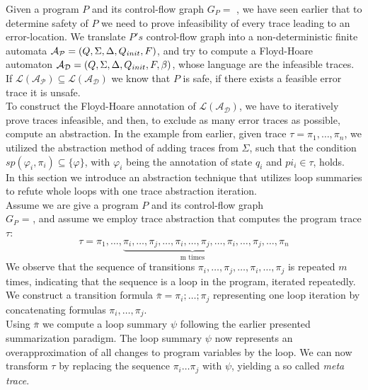 
Given a program $P$ and its control-flow graph $G_P = $ \cfg, we have seen earlier that to determine safety of $P$ we need to prove infeasibility of every trace leading to an error-location. We translate $P's$ control-flow graph into a non-deterministic finite automata $\mathcal{A_{P}} = (Q, \Sigma, \Delta, Q_{init}, F)$, and try to compute a Floyd-Hoare automaton $\mathcal{A_{D}} = (Q, \Sigma, \Delta, Q_{init}, F, \beta)$, whose language are the infeasible traces. If $\mathcal{L(A_P)} \subseteq \mathcal{L(A_D)}$ we know that $P$ is safe, if there exists a feasible error trace it is unsafe. \\ To construct the Floyd-Hoare annotation of $\mathcal{L(A_D)}$, we have to iteratively prove traces infeasible, and then, to exclude as many error traces as possible, compute an abstraction. In the example from earlier, given trace $\tau = \pi_1, \ldots, \pi_n$, we utilized the abstraction method of adding traces from $\Sigma$, such that the condition $sp(\varphi_i, \pi_i) \subseteq \{\varphi\}$, with $\varphi_i$ being the annotation of state $q_i$ and $pi_i \in \tau$, holds. \\
In this section we introduce an abstraction technique that utilizes loop summaries to refute whole loops with one trace abstraction iteration. \\

Assume we are give a program $P$ and its control-flow graph \\ $G_P$ = \cfg, and assume we employ trace abstraction that computes the program trace $\tau$:
\begin{equation*}
	\tau = \pi_1, \ldots, \underbrace{\pi_i, \ldots, \pi_j, \ldots, \pi_i, \ldots, \pi_j, \ldots, \pi_i, \ldots, \pi_j}_{\text{m times}}, \ldots, \pi_n
\end{equation*}
We observe that the sequence of transitions $\pi_i, \ldots, \pi_j, \ldots, \pi_i, \ldots, \pi_j$ is repeated $m$ times, indicating that the sequence is a loop in the program, iterated repeatedly. We construct a transition formula $\bar{\pi} = \pi_i; \ldots; \pi_j$ representing one loop iteration by concatenating formulas $\pi_i, \ldots, \pi_j$. \\
Using $\bar{\pi}$ we compute a \qvasr loop summary $\psi$ following the earlier presented summarization paradigm. The loop summary $\psi$ now represents an overapproximation of all changes to program variables by the loop. We can now transform $\tau$ by replacing the sequence $\pi_i \ldots \pi_j$ with $\psi$, yielding a so called \textsl{meta trace}.


